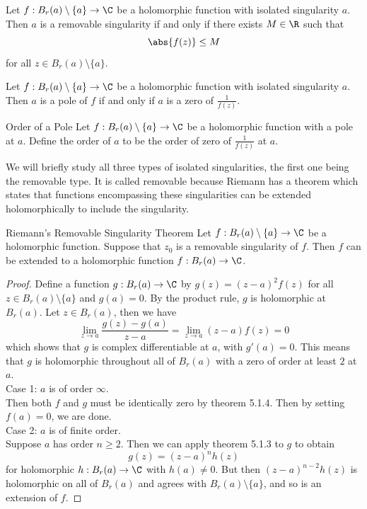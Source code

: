 \documentclass[a4paper]{article}
\begin{document}
\begin{lmm}{}{} Let $f:B_r(a)\setminus\{a\}\to\C$ be a holomorphic function with isolated singularity $a$. Then $a$ is a removable singularity if and only if there exists $M\in\R$ such that $$\abs{f(z)}\leq M$$ for all $z\in B_r(a)\setminus\{a\}$. 
\end{lmm}

\begin{lmm}{}{} Let $f:B_r(a)\setminus\{a\}\to\C$ be a holomorphic function with isolated singularity $a$. Then $a$ is a pole of $f$ if and only if $a$ is a zero of $\frac{1}{f(z)}$. 
\end{lmm}

\begin{defn}{Order of a Pole}{} Let $f:B_r(a)\setminus\{a\}\to\C$ be a holomorphic function with a pole at $a$. Define the order of $a$ to be the order of zero of $\frac{1}{f(z)}$ at $a$. 
\end{defn}

We will briefly study all three types of isolated singularities, the first one being the removable type. It is called removable because Riemann has a theorem which states that functions encompassing these singularities can be extended holomorphically to include the singularity. 

\begin{thm}{Riemann's Removable Singularity Theorem}{} Let $f:B_r(a)\setminus\{a\}\to\C$ be a holomorphic function. Suppose that $z_0$ is a removable singularity of $f$. Then $f$ can be extended to a holomorphic function $f:B_r(a)\to\C$. 
\begin{proof}
Define a function $g:B_r(a)\to\C$ by $g(z)=(z-a)^2f(z)$ for all $z\in B_r(a)\setminus\{a\}$ and $g(a)=0$. By the product rule, $g$ is holomorphic at $B_r(a)$. Let $z\in B_r(a)$, then we have $$\lim_{z\to a}\frac{g(z)-g(a)}{z-a}=\lim_{z\to a}(z-a)f(z)=0$$ which shows that $g$ is complex differentiable at $a$, with $g'(a)=0$. This means that $g$ is holomorphic throughout all of $B_r(a)$ with a zero of order at least $2$ at $a$. \\

Case 1: $a$ is of order $\infty$. \\
Then both $f$ and $g$ must be identically zero by theorem 5.1.4. Then by setting $f(a)=0$, we are done. \\

Case 2: $a$ is of finite order. \\
Suppose $a$ has order $n\geq 2$. Then we can apply theorem 5.1.3 to $g$ to obtain $$g(z)=(z-a)^nh(z)$$ for holomorphic $h:B_r(a)\to\C$ with $h(a)\neq 0$. But then $(z-a)^{n-2}h(z)$ is holomorphic on all of $B_r(a)$ and agrees with $B_r(a)\setminus\{a\}$, and so is an extension of $f$. 
\end{proof}
\end{thm}
\end{document}
